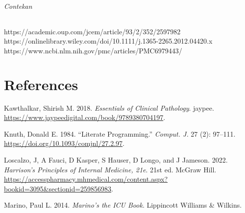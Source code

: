\documentclass[
  letterpaper,
  DIV=11,
  numbers=noendperiod]{scrreprt}
\let\oldsubparagraph\subparagraph
\renewcommand{\subparagraph}[1]{\oldsubparagraph{#1}\mbox{}}
\newlength{\cslhangindent}
\newenvironment{CSLReferences}[2] %
 {\begin{list}{}{%
  \setlength{\itemindent}{0pt}
  \setlength{\leftmargin}{0pt}
  \setlength{\parsep}{0pt}
  \ifodd #1
   \setlength{\leftmargin}{\cslhangindent}
   \setlength{\itemindent}{-1\cslhangindent}
  \fi
  \setlength{\itemsep}{#2\baselineskip}}}
 {\end{list}}
\begin{document}
\subparagraph{Contekan}\label{contekan}

https://academic.oup.com/jcem/article/93/2/352/2597982
https://onlinelibrary.wiley.com/doi/10.1111/j.1365-2265.2012.04420.x
https://www.ncbi.nlm.nih.gov/pmc/articles/PMC6979443/


\chapter*{References}\label{references}


\label{refs}
\begin{CSLReferences}{1}{0}
Kawthalkar, Shirish M. 2018. \emph{Essentials of {Clinical}
{Pathology}}. jaypee.
\url{https://www.jaypeedigital.com/book/9789380704197}.

Knuth, Donald E. 1984. {``Literate Programming.''} \emph{Comput. J.} 27
(2): 97--111. \url{https://doi.org/10.1093/comjnl/27.2.97}.

Loscalzo, J, A Fauci, D Kasper, S Hauser, D Longo, and J Jameson. 2022.
\emph{Harrison's {Principles} of {Internal} {Medicine}, 21e}. 21st ed.
McGraw Hill.
\url{https://accesspharmacy.mhmedical.com/content.aspx?bookid=3095&sectionid=259856983}.

Marino, Paul L. 2014. \emph{Marino's the ICU Book}. Lippincott Williams
\& Wilkins.

\end{CSLReferences}



\printindex
\end{document}
